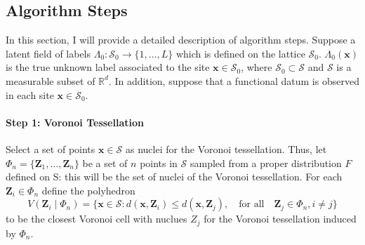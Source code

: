 \subsection{Algorithm Steps}
\label{subsec:algsteps}
In this section, I will provide a detailed description of algorithm steps.
Suppose a latent field of labels $\Lambda_0:\mathcal{S}_0 \rightarrow \{1,\dots,L\}$ which is defined on the lattice $\mathcal{S}_0$. $\Lambda_0(\mathbf{x})$ is the true unknown label associated to the site $\mathbf{x}\in\mathcal{S}_0$, where $\mathcal{S}_0 \subset \mathcal{S}$ and $\mathcal{S}$ is a measurable subset of $\mathbb{R}^d$. In addition, suppose that a functional datum is observed in each site $\mathbf{x}\in\mathcal{S_0}$.
\paragraph{Step 1: Voronoi Tessellation} Select a set of points $\mathbf{x}\in\mathcal{S}$ as nuclei for the Voronoi tessellation. Thus, let $\Phi_n=\{\mathbf{Z}_1, \dots, \mathbf{Z}_n\}$ be a set of $n$ points in $\mathcal{S}$ sampled from a proper distribution $F$ defined on S: this will be the set of nuclei of the Voronoi tessellation. For each $\mathbf{Z}_i\in\Phi_n$ define the polyhedron
\begin{equation}
    \label{eq:polyedron}
    V\left(\mathbf{Z}_i \mid \Phi_n\right)=\{\mathbf{x}\in\mathcal{S} : d\left(\mathbf{x},\mathbf{Z}_i\right) \leq d\left(\mathbf{x}, \mathbf{Z}_j\right), \quad \text{for all}\quad \mathbf{Z}_j \in \Phi_n, i\neq j\}
\end{equation}
to be the closest Voronoi cell with nuclues $Z_j$ for the Voronoi tessellation induced by $\Phi_n$.
